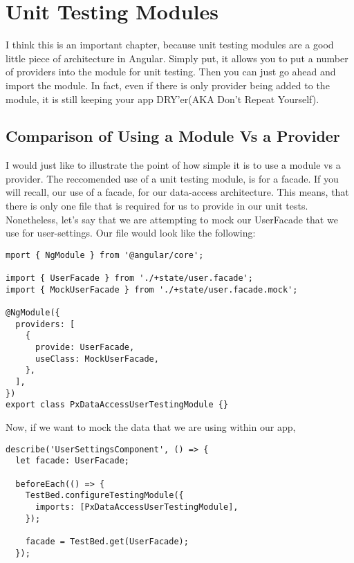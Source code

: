 \maketitle{}
\section{ Unit Testing Modules }
I think this is an important chapter, because unit testing modules are a good
little piece of architecture in Angular. Simply put, it allows you to put a
number of providers into the module for unit testing. Then you can just go
ahead and import the module. In fact, even if there is only provider being
added to the module, it is still keeping your app DRY'er(AKA Don't Repeat
Yourself).

\subsection{Comparison of Using a Module Vs a Provider}
I would just like to illustrate the point of how simple it is to use a module
vs a provider. The reccomended use of a unit testing module, is for a facade.
If you will recall, our use of a facade, for our data-access architecture. This
means, that there is only one file that is required for us to provide in our
unit tests. Nonetheless, let's say that we are attempting to mock our UserFacade
that we use for user-settings. Our file would look like the following:

\begin{lstlisting}
mport { NgModule } from '@angular/core';

import { UserFacade } from './+state/user.facade';
import { MockUserFacade } from './+state/user.facade.mock';

@NgModule({
  providers: [
    {
      provide: UserFacade,
      useClass: MockUserFacade,
    },
  ],
})
export class PxDataAccessUserTestingModule {}
\end{lstlisting}

Now, if we want to mock the data that we are using within our app,

\begin{lstlisting}
describe('UserSettingsComponent', () => {
  let facade: UserFacade;

  beforeEach(() => {
    TestBed.configureTestingModule({
      imports: [PxDataAccessUserTestingModule],
    });

    facade = TestBed.get(UserFacade);
  });
\end{lstlisting}


